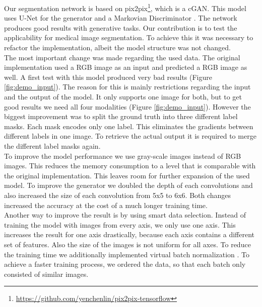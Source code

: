 \documentclass[a4paper,12pt,pagesize,headsepline,bibtotoc,titlepage]{scrartcl}
\begin{document}
Our segmentation network is based on pix2pix\footnote{\url{https://github.com/yenchenlin/pix2pix-tensorflow}}, which is a cGAN.
This model uses U-Net \cite{DBLP:journals/corr/RonnebergerFB15} for the generator and a Markovian Discriminator \cite{cGANs}.
The network produces good results with generative tasks.
Our contribution is to test the applicability for medical image segmentation.
To achieve this it was necessary to refactor the implementation, albeit the model structure was not changed.\\
The most important change was made regarding the used data.
The original implementation used a RGB image as an input and predicted a RGB image as well.
A first test with this model produced very bad results (Figure \ref{fig:demo_input}).
The reason for this is mainly restrictions regarding the input and the output of the model.
It only supports one image for both, but to get good results we need all four modalities (Figure \ref{fig:demo_input}).
However the biggest improvement was to split the ground truth into three different label masks.
Each mask encodes only one label.
This eliminates the gradients between different labels in one image.
To retrieve the actual output it is required to merge the different label masks again.\\
To improve the model performance we use gray-scale images instead of RGB images.
This reduces the memory consumption to a level that is comparable with the original implementation.
This leaves room for further expansion of the used model.
To improve the generator we doubled the depth of each convolutions and also increased the size of each convolution from 5x5 to 6x6.
Both changes increased the accuracy at the cost of a much longer training time.\\
Another way to improve the result is by using smart data selection.
Instead of training the model with images from every axis, we only use one axis.
This increases the result for one axis drastically, because each axis contains a different set of features.
Also the size of the images is not uniform for all axes.
To reduce the training time we additionally implemented virtual batch normalization \cite{DBLP:journals/corr/SalimansGZCRC16}.
To achieve a faster training process, we ordered the data, so that each batch only consisted of similar images.
\end{document}
